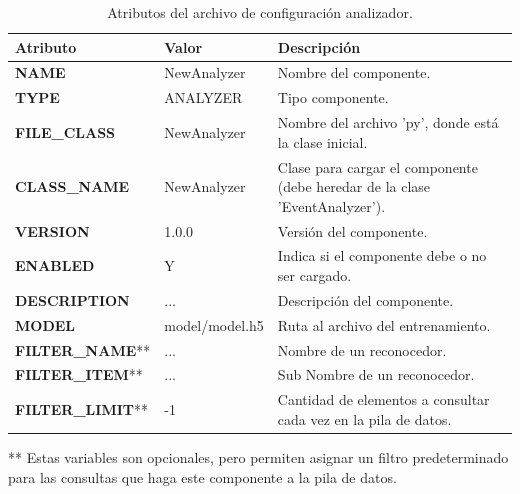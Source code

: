             \begin{table}[ht!]
            \caption[Archivo de configuración analizador]{Atributos del archivo de configuración analizador.}
            \label{Tab:ConfigFileAnalyzer}
            \centering
            \begin{tabular}{ | l l p{7cm} | } 
                \hline
                \textbf{Atributo}       & \textbf{Valor} & \textbf{Descripción} \\ 
                \hline\hline
                \textbf{NAME}           & NewAnalyzer & Nombre del componente.\\
                \hline
                \textbf{TYPE}           & ANALYZER    & Tipo componente.\\
                \hline
                \textbf{FILE\_CLASS}    & NewAnalyzer & Nombre del archivo 'py', donde está la clase inicial.\\
                \hline
                \textbf{CLASS\_NAME}    & NewAnalyzer & Clase para cargar el componente (debe heredar de la clase 'EventAnalyzer').\\
                \hline
                \textbf{VERSION}        & 1.0.0         &  Versión del componente.\\
                \hline
                \textbf{ENABLED}        & Y             & Indica si el componente debe o no ser cargado.\\
                \hline
                \textbf{DESCRIPTION}    & ...           &  Descripción del componente.\\
                \hline
                \textbf{MODEL}          & model/model.h5 & Ruta al archivo del entrenamiento.\\
                \hline
                \textbf{FILTER\_NAME}** & ...           & Nombre de un reconocedor.\\
                \hline
                \textbf{FILTER\_ITEM}** & ...           & Sub Nombre de un reconocedor.\\
                \hline
                \textbf{FILTER\_LIMIT}**& -1            & Cantidad de elementos a consultar cada vez en la pila de datos.\\
                \hline
            \end{tabular}
            \newline
            ** Estas variables son opcionales, pero permiten asignar un filtro predeterminado para las consultas que haga este componente a la pila de datos.
            \end{table}

